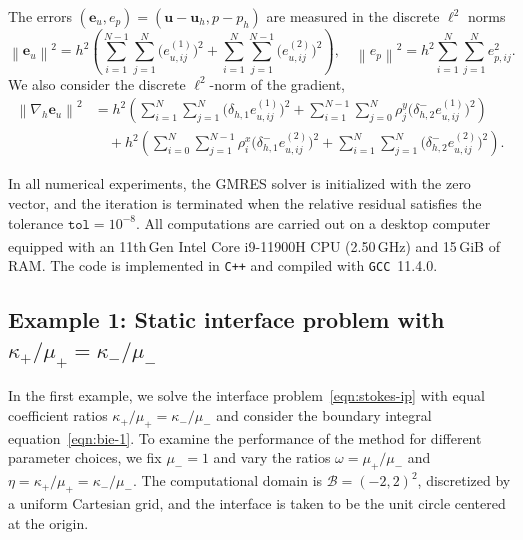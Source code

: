 \documentclass[preprint,11pt]{elsarticle}
\theoremstyle{remark}
\newcommand{\paren}[1]{\left(#1\right)}
\newcommand{\mc}[1]{\mathcal{#1}}
\newcommand{\bm}[1]{\boldsymbol{#1}}
\newcommand{\norm}[1]{\left\lVert #1 \right\rVert}
\begin{document}
The errors $(\bm e_{u}, e_p) = (\bm u-\bm u_h, p - p_h)$ are measured in the discrete $\ell^2$ norms
\begin{equation}
    \norm{\bm e_{u}}^2 
    = h^2\paren{\sum_{i=1}^{N-1}\sum_{j=1}^N \bigl(e_{u,ij}^{(1)}\bigr)^2 
      + \sum_{i=1}^N\sum_{j=1}^{N-1}\bigl(e_{u,ij}^{(2)}\bigr)^2},
    \quad 
    \norm{e_p}^2 
    = h^2 \sum_{i=1}^N\sum_{j=1}^N e_{p,ij}^2.
\end{equation}
We also consider the discrete $\ell^2$-norm of the gradient,
\begin{equation}
\begin{aligned}
    \norm{\nabla_h \bm e_u}^2 
    &= h^2 \paren{\sum_{i=1}^N\sum_{j=1}^{N} \bigl(\delta_{h,1} e_{u,ij}^{(1)}\bigr)^2 
      + \sum_{i=1}^{N-1}\sum_{j=0}^N \rho_j^y \bigl(\delta_{h,2}^- e_{u,ij}^{(1)}\bigr)^2 } \\
    &\quad + h^2\paren{\sum_{i=0}^N \sum_{j=1}^{N-1} \rho_i^x \bigl(\delta_{h,1}^- e_{u,ij}^{(2)}\bigr)^2  
      + \sum_{i=1}^N\sum_{j=1}^N \bigl(\delta_{h,2}^- e_{u,ij}^{(2)}\bigr)^2 }.
\end{aligned}
\end{equation}

In all numerical experiments, the GMRES solver is initialized with the zero vector, and the iteration is terminated when the relative residual satisfies the tolerance $\texttt{tol} = 10^{-8}$. 
All computations are carried out on a desktop computer equipped with an 11th\,Gen Intel\textsuperscript{\textregistered} Core\texttrademark{} i9-11900H CPU (2.50\,GHz) and 15\,GiB of RAM. 
The code is implemented in \texttt{C++} and compiled with \texttt{GCC}~11.4.0.



\subsection{Example 1: Static interface problem with $\kappa_+/\mu_+ = \kappa_-/\mu_-$}
In the first example, we solve the interface problem~\eqref{eqn:stokes-ip} with equal coefficient ratios $\kappa_+/\mu_+ = \kappa_-/\mu_-$ and consider the boundary integral equation~\eqref{eqn:bie-1}. 
To examine the performance of the method for different parameter choices, we fix $\mu_- = 1$ and vary the ratios $\omega = \mu_+ / \mu_-$ and $\eta = \kappa_+ / \mu_+ =  \kappa_- / \mu_-$. 
The computational domain is $\mc B = (-2,2)^2$, discretized by a uniform Cartesian grid, and the interface is taken to be the unit circle centered at the origin.
\end{document}
